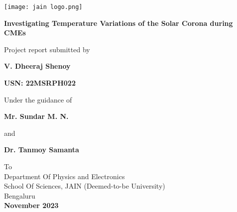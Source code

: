 \documentclass[12pt]{article}
\def \projectname {Investigating Temperature Variations of the Solar Corona during CMEs}
\def \auth {V. Dheeraj Shenoy}
\def \gnameOne {Mr. Sundar M. N.}
\def \gnameTwo {Dr. Tanmoy Samanta}
\begin{document}
\begin{center}

    \thispagestyle{empty}

    \texttt{[image: jain logo.png]}

    \vspace{0.7cm}

    \textbf{\Large{{\projectname}}}

    \vspace{0.5cm}

    \Large{Project report submitted by}

    \textbf{\large{\auth}}

    \textbf{\normalsize{USN: 22MSRPH022}}

    \vspace{0.5cm}

    \Large{Under the guidance of}

    \textbf{\large{\gnameOne}}

    \large{and}

    \textbf{\large{\gnameTwo}}

    \vspace{0.75cm}

    To\\
    Department Of Physics and Electronics \\
    School Of Sciences, JAIN (Deemed-to-be University)\\
    Bengaluru\\

    \vspace{1cm}
    \textbf{\large{November 2023}}

\end{center}

\newpage


\newpage


\newpage


\newpage


\newpage
\thispagestyle{empty}

\newpage



\newpage



\newpage



\newpage

\printbibliography
\end{document}
